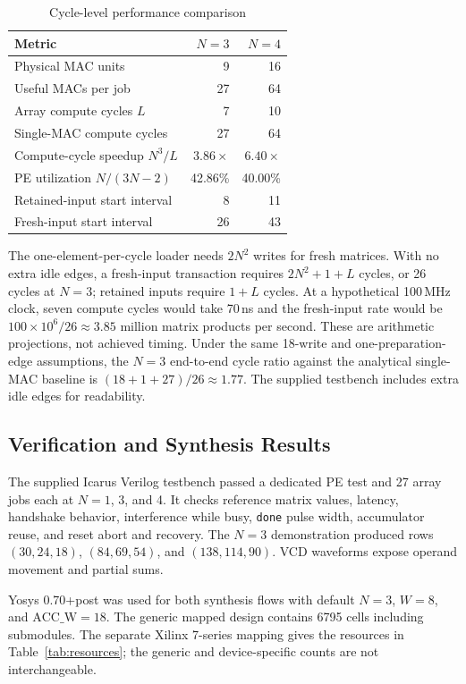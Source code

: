 \documentclass[conference]{IEEEtran}
\begin{document}
\begin{table}[t]
\caption{Cycle-level performance comparison}
\label{tab:perf}
\centering
\footnotesize
\begin{tabular}{@{}lrr@{}}
\toprule
Metric & $N=3$ & $N=4$ \\
\midrule
Physical MAC units & 9 & 16 \\
Useful MACs per job & 27 & 64 \\
Array compute cycles $L$ & 7 & 10 \\
Single-MAC compute cycles & 27 & 64 \\
Compute-cycle speedup $N^3/L$ & $3.86\times$ & $6.40\times$ \\
PE utilization $N/(3N-2)$ & 42.86\% & 40.00\% \\
Retained-input start interval & 8 & 11 \\
Fresh-input start interval & 26 & 43 \\
\bottomrule
\end{tabular}
\end{table}

The one-element-per-cycle loader needs $2N^2$ writes for fresh matrices. With no extra idle edges, a fresh-input transaction requires $2N^2+1+L$ cycles, or 26 cycles at $N=3$; retained inputs require $1+L$ cycles. At a hypothetical 100\,MHz clock, seven compute cycles would take 70\,ns and the fresh-input rate would be $100\times10^6/26\approx3.85$ million matrix products per second. These are arithmetic projections, not achieved timing. Under the same 18-write and one-preparation-edge assumptions, the $N=3$ end-to-end cycle ratio against the analytical single-MAC baseline is $(18+1+27)/26\approx1.77$. The supplied testbench includes extra idle edges for readability.

\subsection{Verification and Synthesis Results}
The supplied Icarus Verilog testbench passed a dedicated PE test and 27 array jobs each at $N=1$, 3, and 4. It checks reference matrix values, latency, handshake behavior, interference while busy, \texttt{done} pulse width, accumulator reuse, and reset abort and recovery. The $N=3$ demonstration produced rows $(30,24,18)$, $(84,69,54)$, and $(138,114,90)$. VCD waveforms expose operand movement and partial sums.

Yosys 0.70+post was used for both synthesis flows with default $N=3$, $W=8$, and $\mathrm{ACC\_W}=18$. The generic mapped design contains 6795 cells including submodules. The separate Xilinx 7-series mapping gives the resources in Table~\ref{tab:resources}; the generic and device-specific counts are not interchangeable.
\end{document}
